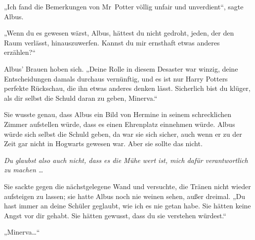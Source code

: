 „Ich fand die Bemerkungen von Mr~Potter völlig unfair und unverdient“, sagte Albus.

„Wenn du es gewesen wärst, Albus, hättest du nicht gedroht, jeden, der den Raum verlässt, hinauszuwerfen. Kannst du mir ernsthaft etwas anderes erzählen?“

Albus' Brauen hoben sich.
„Deine Rolle in diesem Desaster war winzig, deine Entscheidungen damals durchaus vernünftig, und es ist nur Harry Potters perfekte Rückschau, die ihn etwas anderes denken lässt. Sicherlich bist du klüger, als dir selbst die Schuld daran zu geben, Minerva.“

Sie wusste genau, dass Albus ein Bild von Hermine in seinem schrecklichen Zimmer aufstellen würde, dass es einen Ehrenplatz einnehmen würde. Albus würde sich selbst die Schuld geben, da war sie sich sicher, auch wenn er zu der Zeit gar nicht in Hogwarts gewesen war. Aber sie sollte das nicht.

\emph{Du glaubst also auch nicht, dass es die Mühe wert ist, mich dafür verantwortlich zu machen …}

Sie sackte gegen die nächstgelegene Wand und versuchte, die Tränen nicht wieder aufsteigen zu lassen; sie hatte Albus noch nie weinen sehen, außer dreimal.
„Du hast immer an deine Schüler geglaubt, wie ich es nie getan habe. Sie hätten keine Angst vor dir gehabt. Sie hätten gewusst, dass du sie verstehen würdest.“

„Minerva…“

